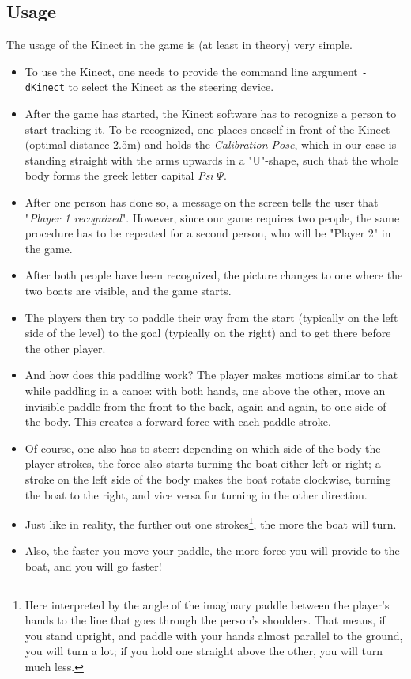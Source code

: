 \subsection{Usage}
The usage of the Kinect in the game is (at least in theory) very simple.
\begin{itemize}
\item To use the Kinect, one needs to provide the command line argument \texttt{-dKinect} to select the Kinect as the steering device.
\item After the game has started, the Kinect software has to recognize a person to start tracking it. To be recognized, one places oneself in front of the Kinect (optimal distance 2.5m) and holds the \emph{Calibration Pose}, which in our case is standing straight with the arms upwards in a "U"-shape, such that the whole body forms the greek letter capital \emph{Psi} $\Psi$.
\item After one person has done so, a message on the screen tells the user that "\emph{Player 1 recognized}". However, since our game requires two people, the same procedure has to be repeated for a second person, who will be "Player 2" in the game.
\item After both people have been recognized, the picture changes to one where the two boats are visible, and the game starts.
\item The players then try to paddle their way from the start (typically on the left side of the level) to the goal (typically on the right) and to get there before the other player.
\item And how does this paddling work? The player makes motions similar to that while paddling in a canoe: with both hands, one above the other, move an invisible paddle from the front to the back, again and again, to one side of the body. This creates a forward force with each paddle stroke. 
\item Of course, one also has to steer: depending on which side of the body the player strokes, the force also starts turning the boat either left or right; a stroke on the left side of the body makes the boat rotate clockwise, turning the boat to the right, and vice versa for turning in the other direction.
\item Just like in reality, the further out one strokes\footnote{Here interpreted by the angle of the imaginary paddle between the player's hands to the line that goes through the person's shoulders. That means, if you stand upright, and paddle with your hands almost parallel to the ground, you will turn a lot; if you hold one straight above the other, you will turn much less.}, the more the boat will turn.
\item Also, the faster you move your paddle, the more force you will provide to the boat, and you will go faster!
\end{itemize}

